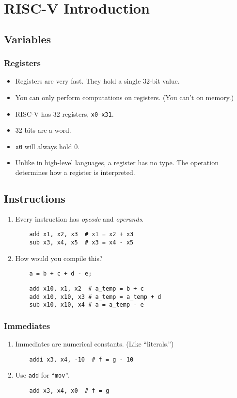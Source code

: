\chapter{RISC-V Introduction}
\section{Variables}

\subsection{Registers}
\begin{itemize}
	\item Registers are very fast. They hold a single 32-bit value.
	\item You can only perform computations on registers. (You can't on memory.)
	\item RISC-V has 32 registers, \texttt{x0}--\texttt{x31}.
	\item 32 bits are a word.
	\item \texttt{x0} will always hold 0.
	\item Unlike in high-level languages, a register has no type. The operation determines how a register is interpreted.
\end{itemize}

\section{Instructions}
\begin{enumerate}
	\item Every instruction has \emph{opcode} and \emph{operands}.
	
	\begin{verbatim}
	add x1, x2, x3  # x1 = x2 + x3
	sub x3, x4, x5  # x3 = x4 - x5
	\end{verbatim}
	\item How would you compile this?
	\begin{verbatim}
	a = b + c + d - e;
	\end{verbatim}
	
	\begin{verbatim}
	add x10, x1, x2  # a_temp = b + c
	add x10, x10, x3 # a_temp = a_temp + d
	sub x10, x10, x4 # a = a_temp - e
	\end{verbatim}
\end{enumerate}

\subsection{Immediates}
\begin{enumerate}
	\item Immediates are numerical constants. (Like ``literals.'')
	\begin{verbatim}
	addi x3, x4, -10  # f = g - 10
	\end{verbatim}
	\item Use \texttt{add} for ``\texttt{mov}''.
	\begin{verbatim}
	add x3, x4, x0  # f = g
	\end{verbatim}
\end{enumerate}

